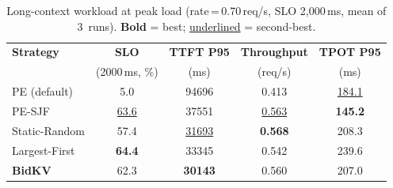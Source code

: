 \begin{table}[t]
\centering
\caption{Long-context workload at peak load (rate\,=\,0.70\,req/s,
  SLO 2{,}000\,ms, mean of 3~runs).
  \textbf{Bold} = best; \underline{underlined} = second-best.}
\label{tab:long_context}
\footnotesize
\begin{tabular}{@{}l c c c c@{}}
\toprule
\textbf{Strategy} & \textbf{SLO}
  & \textbf{TTFT P95} & \textbf{Throughput} & \textbf{TPOT P95} \\
  & (2000\,ms, \%) & (ms) & (req/s) & (ms) \\
\midrule
PE (default)      &  5.0 & 94696 & 0.413 & \underline{184.1} \\
PE-SJF            & \underline{63.6} & 37551 & \underline{0.563} & \textbf{145.2} \\
Static-Random     & 57.4 & \underline{31693} & \textbf{0.568} & 208.3 \\
Largest-First     & \textbf{64.4} & 33345 & 0.542 & 239.6 \\
\textbf{BidKV}    & 62.3 & \textbf{30143} & 0.560 & 207.0 \\
\bottomrule
\end{tabular}
\end{table}
